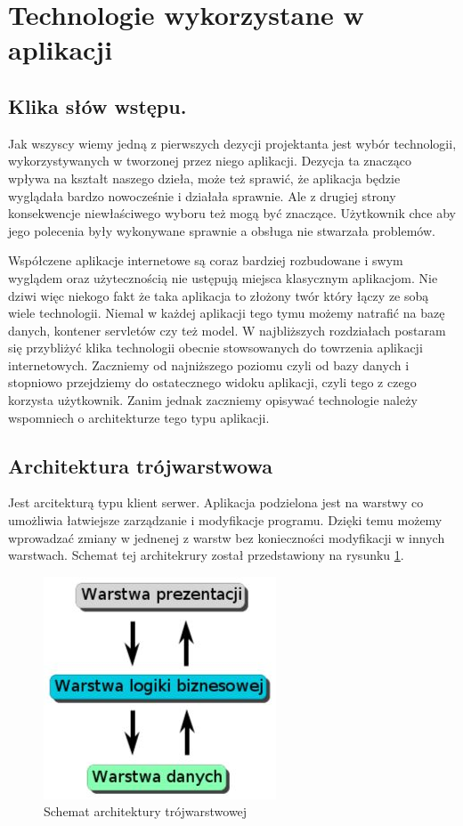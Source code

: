 

\section{Technologie wykorzystane w aplikacji}
\subsection{Klika słów wstępu.}
Jak wszyscy wiemy jedną z pierwszych dezycji projektanta jest wybór technologii, 
wykorzystywanych w tworzonej przez niego aplikacji. Dezycja ta znacząco wpływa na kształt naszego dzieła,
może też sprawić, że aplikacja będzie wyglądała bardzo nowocześnie i działała sprawnie. Ale z drugiej strony 
konsekwencje niewłaściwego wyboru też mogą być znaczące. Użytkownik chce aby jego polecenia były wykonywane
sprawnie a obsługa nie stwarzała problemów.

Współczene aplikacje internetowe są coraz bardziej rozbudowane i swym wyglądem oraz użytecznością nie ustępują
miejsca klasycznym aplikacjom. Nie dziwi więc niekogo fakt że taka aplikacja to złożony twór który łączy ze 
sobą wiele technologii. Niemal w każdej aplikacji tego tymu możemy natrafić na bazę danych, kontener servletów
czy też model. W najbliższych rozdziałach postaram się przybliżyć klika technologii obecnie stowsowanych do 
towrzenia aplikacji internetowych. Zaczniemy od najniższego poziomu czyli od bazy danych i stopniowo 
przejdziemy do ostatecznego widoku aplikacji, czyli tego z czego korzysta użytkownik. Zanim jednak zaczniemy 
opisywać technologie należy wspomniech o architekturze tego typu aplikacji.

\subsection{Architektura trójwarstwowa}
Jest arcitekturą typu klient serwer. Aplikacja podzielona jest na warstwy co umożliwia łatwiejsze
zarządzanie i modyfikacje programu. Dzięki temu możemy wprowadzać zmiany w jednenej z warstw bez konieczności
modyfikacji w innych warstwach. Schemat tej architekrury został przedstawiony na rysunku \ref{architekturaTrojwarstwowaRysunek}.
\begin{figure}[h]\centering

\includegraphics[scale=0.5]{architekturaTrojwarstwowa.jpg}
\caption{Schemat architektury trójwarstwowej}
\label{architekturaTrojwarstwowaRysunek}
\end{figure}
